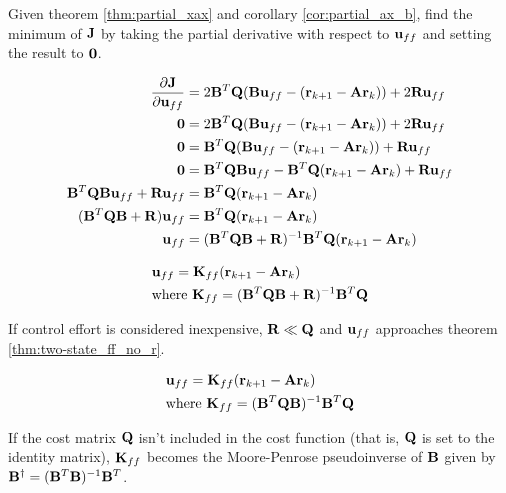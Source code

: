Given theorem \ref{thm:partial_xax} and corollary \ref{cor:partial_ax_b}, find
the minimum of $\mathbf{J}$ by taking the partial derivative with respect to
$\mathbf{u}_{ff}$ and setting the result to $\mathbf{0}$.

\begin{align*}
  \frac{\partial\mathbf{J}}{\partial\mathbf{u}_{ff}} &= 2\mathbf{B}^T\mathbf{Q}
    (\mathbf{B}\mathbf{u}_{ff} - (\mathbf{r}_{k+1} - \mathbf{A}\mathbf{r}_k)) +
    2\mathbf{R}\mathbf{u}_{ff} \\
  \mathbf{0} &= 2\mathbf{B}^T\mathbf{Q}
    (\mathbf{B}\mathbf{u}_{ff} - (\mathbf{r}_{k+1} - \mathbf{A}\mathbf{r}_k)) +
    2\mathbf{R}\mathbf{u}_{ff} \\
  \mathbf{0} &= \mathbf{B}^T\mathbf{Q}
    (\mathbf{B}\mathbf{u}_{ff} - (\mathbf{r}_{k+1} - \mathbf{A}\mathbf{r}_k)) +
    \mathbf{R}\mathbf{u}_{ff} \\
  \mathbf{0} &= \mathbf{B}^T\mathbf{Q}\mathbf{B}\mathbf{u}_{ff} -
    \mathbf{B}^T\mathbf{Q}(\mathbf{r}_{k+1} - \mathbf{A}\mathbf{r}_k) + \mathbf{R}\mathbf{u}_{ff} \\
  \mathbf{B}^T\mathbf{Q}\mathbf{B}\mathbf{u}_{ff} + \mathbf{R}\mathbf{u}_{ff} &=
    \mathbf{B}^T\mathbf{Q}(\mathbf{r}_{k+1} - \mathbf{A}\mathbf{r}_k) \\
  (\mathbf{B}^T\mathbf{Q}\mathbf{B} + \mathbf{R})\mathbf{u}_{ff} &=
    \mathbf{B}^T\mathbf{Q}(\mathbf{r}_{k+1} - \mathbf{A}\mathbf{r}_k) \\
  \mathbf{u}_{ff} &= (\mathbf{B}^T\mathbf{Q}\mathbf{B} + \mathbf{R})^{-1}
    \mathbf{B}^T\mathbf{Q}(\mathbf{r}_{k+1} - \mathbf{A}\mathbf{r}_k)
\end{align*}

\begin{theorem}
  \begin{align}
    &\mathbf{u}_{ff} = \mathbf{K}_{ff} (\mathbf{r}_{k+1} - \mathbf{A}\mathbf{r}_k) \\
    &\text{where } \mathbf{K}_{ff} =
      (\mathbf{B}^T\mathbf{Q}\mathbf{B} + \mathbf{R})^{-1}\mathbf{B}^T\mathbf{Q}
  \end{align}
  \label{thm:two-state_ff}
\end{theorem}

If control effort is considered inexpensive, $\mathbf{R} \ll \mathbf{Q}$ and
$\mathbf{u}_{ff}$ approaches theorem \ref{thm:two-state_ff_no_r}.

\begin{theorem}
  \begin{align}
    &\mathbf{u}_{ff} = \mathbf{K}_{ff} (\mathbf{r}_{k+1} - \mathbf{A}\mathbf{r}_k) \\
    &\text{where } \mathbf{K}_{ff} =
      (\mathbf{B}^T\mathbf{Q}\mathbf{B})^{-1}\mathbf{B}^T\mathbf{Q}
  \end{align}
  \label{thm:two-state_ff_no_r}
\end{theorem}

\begin{remark}
  If the cost matrix $\mathbf{Q}$ isn't included in the cost function (that is,
  $\mathbf{Q}$ is set to the identity matrix), $\mathbf{K}_{ff}$ becomes the
  Moore-Penrose pseudoinverse of $\mathbf{B}$ given by
  $\mathbf{B}^\dagger = (\mathbf{B}^T\mathbf{B})^{-1}\mathbf{B}^T$.
\end{remark}
